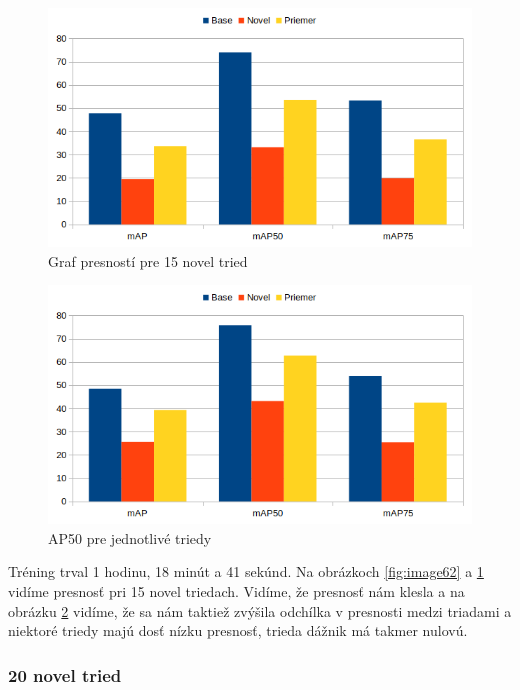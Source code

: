 \begin{figure}[H]
\centering
\includegraphics[width=\textwidth]{images/15novel_chart.png}
\caption{Graf presností pre 15 novel tried}
\label{fig:image63}
\end{figure}

\begin{figure}[H]
\centering
\includegraphics[width=\textwidth]{images/10novel_chart.png}
\caption{AP50 pre jednotlivé triedy}
\label{fig:image612}
\end{figure}

Tréning trval 1 hodinu, 18 minút a 41 sekúnd. Na obrázkoch \ref{fig:image62} a \ref{fig:image63} vidíme presnosť pri 15 novel triedach. Vidíme, že presnosť nám klesla a na obrázku \ref{fig:image612} vidíme, že sa nám taktiež zvýšila odchílka v presnosti medzi triadami a niektoré triedy majú dosť nízku presnosť, trieda dážnik má takmer nulovú.

\subsubsection{20 novel tried}

